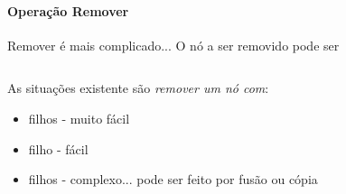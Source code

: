 



\begin{frame}[label=notas]
	\framesubtitle{Operação Remover}

	Remover é mais complicado... \pause O nó a ser removido pode ser
	\begin{columns}[T]
		\centering
		\centering
		\centering
	\end{columns}
	\pause\vfill
	As situações existente são \emph{remover um nó com}:
	\begin{itemize}
		\item[0] filhos \pause - muito fácil
		\item[1] filho \pause - fácil
		\item[2] filhos \pause - complexo... pode ser feito por fusão ou cópia
	\end{itemize}
\end{frame}

